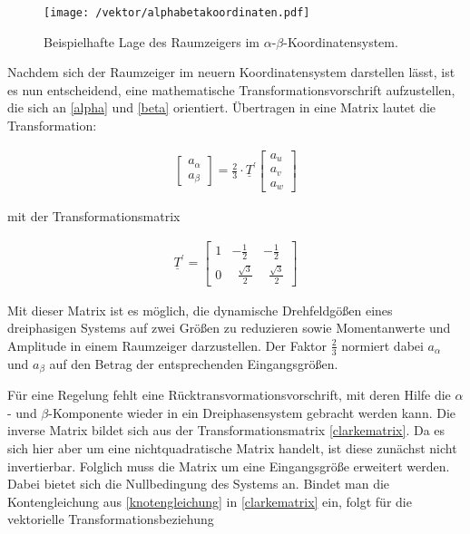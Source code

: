 \begin{figure}[h]
	\centering
	\texttt{[image: /vektor/alphabetakoordinaten.pdf]}
	\label{fig:alphabetakoordinaten}
	\caption{Beispielhafte Lage des Raumzeigers im $\alpha$-$\beta$-Koordinatensystem.}
\end{figure}

Nachdem sich der Raumzeiger im neuern Koordinatensystem darstellen lässt, ist es nun entscheidend, eine mathematische Transformationsvorschrift aufzustellen, die sich an \ref{alpha} und \ref{beta} orientiert. 
Übertragen in eine Matrix lautet die Transformation:

\begin{align}
	\begin{bmatrix}
	a_{\alpha} \\
	a_{\beta} 
	\end{bmatrix}
	=\frac{2}{3}\cdot\underline{T}^{\prime}
	\begin{bmatrix}
	a_{u} \\
	a_{v} \\
	a_{w}
	\end{bmatrix}
	\label{clarkevektor}
\end{align}

mit der Transformationsmatrix

\begin{align}
	\underline{T}^{\prime} = 
	\begin{bmatrix}
		1 & -\frac{1}{2} & -\frac{1}{2}  \\
		0 & ~~\frac{\sqrt{3}}{2} & ~~\frac{\sqrt{3}}{2}
	\end{bmatrix}
	\label{clarkematrix}
\end{align}

Mit dieser Matrix ist es möglich, die dynamische Drehfeldgößen eines dreiphasigen Systems auf zwei Größen zu reduzieren sowie Momentanwerte und Amplitude in einem Raumzeiger darzustellen.
Der Faktor $\frac{2}{3}$ normiert dabei $a_{\alpha}$ und $a_{\beta}$ auf den Betrag der entsprechenden Eingangsgrößen.

Für eine Regelung fehlt eine Rücktransvormationsvorschrift, mit deren Hilfe die $\alpha$- und $\beta$-Komponente wieder in ein Dreiphasensystem gebracht werden kann.
Die inverse Matrix bildet sich aus der Transformationsmatrix \ref{clarkematrix}. 
Da es sich hier aber um eine nichtquadratische Matrix handelt, ist diese zunächst nicht invertierbar.
Folglich muss die Matrix um eine Eingangsgröße erweitert werden.
Dabei bietet sich die Nullbedingung des Systems an.
Bindet man die Kontengleichung aus \ref{knotengleichung} in \ref{clarkematrix} ein, folgt für die vektorielle Transformationsbeziehung

